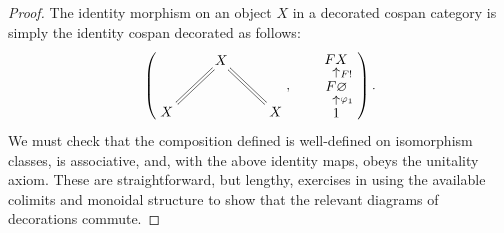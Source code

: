 \begin{proof}
  The identity morphism on an object $X$ in a decorated cospan category is
  simply the identity cospan decorated as follows:
  \[
    \left(
    \begin{aligned}
      \xymatrix{
	& X \\  
	X \ar@{=}[ur] && X \ar@{=}[ul]
      }
    \end{aligned}
    ,
    \qquad
    \begin{aligned}
      \xymatrixrowsep{.5pc}
      \xymatrix{
	FX \\
	F\varnothing \ar[u]_{F!} \\
	1 \ar[u]_{\varphi_1}
      }
    \end{aligned}
    \right).
  \]
  We must check that the composition defined is well-defined on isomorphism
  classes, is associative, and, with the above identity maps, obeys the
  unitality axiom. These are straightforward, but lengthy, exercises in
  using the available colimits and monoidal structure to show that
  the relevant diagrams of decorations commute.


\end{proof}
